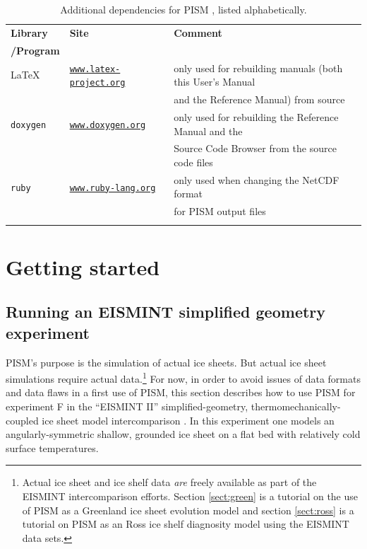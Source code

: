 \documentclass[11pt,final]{amsart}
\renewcommand{\t}[1]{\texttt{#1}}
\begin{document}
\begin{table}[ht]
\caption{Additional dependencies for PISM , listed alphabetically.  }\label{tab:PISMdepends_superdev}
\small
\begin{tabular}{@{}llll}\hline
\textbf{Library} & \textbf{Site} & \textbf{Comment} \\
\textbf{/Program} &  &  &  \\ \hline
\LaTeX & \href{http://www.latex-project.org/}{\t{www.latex-project.org}} & only used for rebuilding manuals (both this User's Manual  \\
 &  & and the Reference Manual) from source \\
\texttt{doxygen}\index{doxygen} & \href{http://www.stack.nl/~dimitri/doxygen/}{\t{www.doxygen.org}} & only used for rebuilding the Reference Manual and the \\
 & & Source Code Browser from the source code files \\
\texttt{ruby} & \href{http://www.ruby-lang.org/en/}{\texttt{www.ruby-lang.org}} & only used when changing the NetCDF format \\
 &  & for PISM output files \\
\hline
\normalsize
\end{tabular}
\end{table}


\clearpage\newpage
\section{Getting started}\label{sect:start}

\subsection{Running an EISMINT simplified geometry experiment}  PISM's purpose is the simulation of actual ice sheets.  But actual ice sheet simulations require actual data.\footnote{Actual ice sheet and ice shelf data \emph{are} freely available as part of the EISMINT intercomparison efforts.  Section \ref{sect:green} is a tutorial on the use of PISM as a Greenland ice sheet evolution model and section \ref{sect:ross} is a tutorial on PISM as an Ross ice shelf diagnosity model using the EISMINT data sets.}  For now, in order to avoid issues of data formats and data flaws in a first use of PISM, this section describes how to use PISM for experiment F in the ``EISMINT II'' simplified-geometry, thermomechanically-coupled ice sheet model intercomparison \cite{EISMINT00}.  In this experiment one models an angularly-symmetric shallow, grounded ice sheet on a flat bed with relatively cold surface temperatures.
\end{document}
